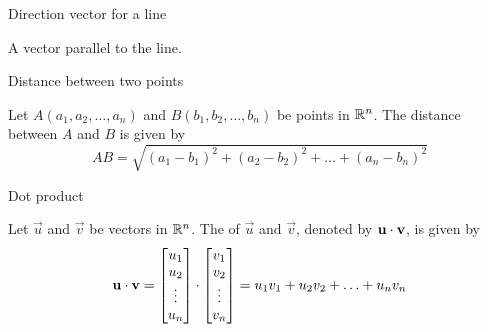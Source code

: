 \documentclass{ximera}
\begin{document}
 
Direction vector for a line

\begin{expandable}{}{}
    A vector parallel to the line.
\end{expandable}


Distance between two points 

\begin{expandable}{}{}
Let $A(a_1, a_2,\ldots ,a_n)$ and $B(b_1, b_2,\ldots ,b_n)$ be points in $\mathbb{R}^n$.  The distance between $A$ and $B$ is given by
$$AB=\sqrt{(a_1-b_1)^2+(a_2-b_2)^2+\ldots +(a_n-b_n)^2}$$
\end{expandable}


Dot product

\begin{expandable}{}{}
  Let $\vec{u}$ and $\vec{v}$ be vectors in $\mathbb{R}^n$.  The  of $\vec{u}$ and $\vec{v}$, denoted by
  $\mathbf{u}\cdot \mathbf{v}$, is given by
$$\mathbf{u}\cdot\mathbf{v}=\begin{bmatrix}u_1\\u_2\\\vdots\\u_n\end{bmatrix}\cdot\begin{bmatrix}v_1\\v_2\\\vdots\\v_n\end{bmatrix}=u_1v_1+u_2v_2+\ldots+u_nv_n$$
\end{expandable}

\end{document}

